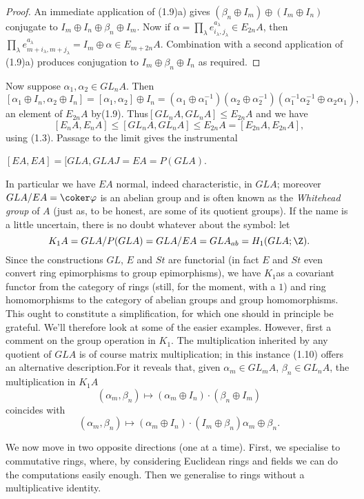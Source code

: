 \begin{proof}
An immediate application of (1.9)a) gives $(\beta_n\oplus I_m)\oplus (I_m\oplus I_n)$ conjugate to
$I_m\oplus I_n \oplus \beta_n\oplus I_m $. Now if $\alpha =\prod_\lambda e_{i_\lambda,j_\lambda}^{a_\lambda}\in E_{2n}A$, then $\prod_\lambda e_{m+i_\lambda,m+j_\lambda}^{a_\lambda}=I_m\oplus \alpha \in E_{m+2n}A$. Combination with a second application of (1.9)a) produces conjugation to $I_m\oplus\beta_n \oplus I_n$ as required.
\end{proof}

Now suppose $\alpha_1,\alpha_2\in GL_nA$. Then
\[[\alpha_1\oplus I_n,\alpha_2\oplus I_n]=[\alpha_1,\alpha_2]\oplus I_n=(\alpha_1\oplus \alpha_1^{-1})(\alpha_2\oplus \alpha_2^{-1})(\alpha_1^{-1}\alpha_2^{-1}\oplus \alpha_2\alpha_1 ),\]
an element of $E_{2n}A$ by(1.9). Thus$[GL_nA,GL_nA]\leqslant E_{2n}A$ and we have
\[[E_nA,E_nA]\leqslant [GL_nA,GL_nA]\leqslant E_{2n}A=[E_{2n}A,E_{2n}A],\]
using (1.3). Passage to the limit gives the instrumental
\begin{lemma}
$[EA,EA]=[GLA,GLAJ=EA=P(GLA)$.
\end{lemma}

In particular we have $EA$ normal, indeed characteristic, in $GLA$; moreover $GLA/EA=\coker \varphi$ is an abelian group and is often known as the {\em Whitehead group} of $A$ (just as, to be honest, are some of its quotient groups). If the name is a little uncertain, there is no doubt whatever about the symbol: let
\[K_1A=GLA/P(GLA)=GLA/EA=GLA_{ab}=H_1(GLA;\Z).\]
Since the constructions $GL$, $E$ and $St$ are functorial (in fact $E$ and $St$ even convert ring epimorphisms to group epimorphisms), we have $K_1$as a covariant functor from the category of rings (still, for the moment, with a $1$) and ring homomorphisms to the category of abelian groups and group homomorphisms. This ought to constitute a simplification, for which one should in principle be grateful. We'll therefore look at some of the easier examples. However, first a comment on the group operation in $K_1$. The multiplication inherited by any quotient of $GLA$ is of course matrix multiplication; in this instance (1.10) offers an alternative description.For it reveals that, given $\alpha_m \in GL_m A$, $\beta_n\in GL_n A$, the multiplication in $K_1A$
\[(\alpha_m,\beta_n)\mapsto (\alpha_m\oplus I_n)\cdot(\beta_n\oplus I_m)\]
coincides with
\[(\alpha_m,\beta_n)\mapsto (\alpha_m\oplus I_n)\cdot(I_m\oplus \beta_n )\alpha_m\oplus\beta_n.\]

We now move in two opposite directions (one at a time). First, we specialise to commutative rings, where, by considering Euclidean rings and fields we can do the computations easily enough. Then we generalise to rings without a multiplicative identity.

